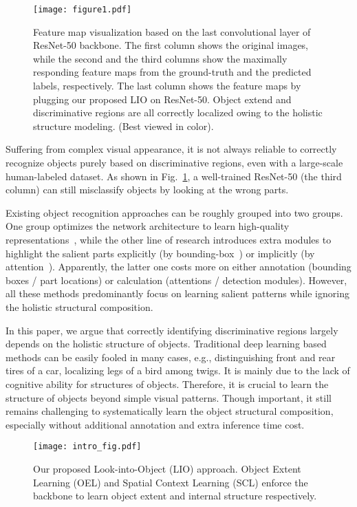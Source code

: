 \documentclass[10pt,twocolumn,letterpaper]{article}
\begin{document}
\begin{figure}[!t]
    \centering
    \texttt{[image: figure1.pdf]}
    \caption{Feature map visualization based on the last convolutional layer of ResNet-50 backbone. The first column shows the original images, while the second and the third columns show the maximally responding feature maps from the ground-truth and the predicted labels, respectively. The last column shows the feature maps by plugging our proposed LIO on ResNet-50. Object extend and discriminative regions are all correctly localized owing to the holistic structure modeling. (Best viewed in color).}
    \label{fig:motivation}
\end{figure}

Suffering from complex visual appearance, it is not always reliable to correctly recognize objects purely based on discriminative regions, even with a large-scale human-labeled dataset. As shown in Fig.~\ref{fig:motivation}, a well-trained ResNet-50 (the third column) can still misclassify objects by looking at the wrong parts.

Existing object recognition approaches can be roughly grouped into two groups. One group optimizes the network architecture to learn high-quality representations~\cite{shih2017deep,BCNN,hu2018squeeze,cui2017kernel}, while the other line of research introduces extra modules to highlight the salient parts explicitly (by bounding-box~\cite{branson2014bird,huang2016part,CoSeq}) or implicitly (by attention~\cite{RACNN,wang2017residual}). Apparently, the latter one costs more on either annotation (\eg bounding boxes / part locations) or calculation (attentions / detection modules). However, all these methods predominantly focus on learning salient patterns while ignoring the holistic structural composition.


In this paper, we argue that correctly identifying discriminative regions largely depends on the holistic structure of objects. Traditional deep learning based methods can be easily fooled in many cases, e.g., distinguishing front and rear tires of a car, localizing legs of a bird among twigs. It is mainly due to the lack of cognitive ability for structures of objects. Therefore, it is crucial to learn the structure of objects beyond simple visual patterns. Though important, it still remains challenging to systematically learn the object structural composition, especially without additional annotation and extra inference time cost.


\begin{figure}[!t]
    \centering
    \texttt{[image: intro\_fig.pdf]}
    \caption{Our proposed Look-into-Object (LIO) approach. Object Extent Learning (OEL) and Spatial Context Learning (SCL) enforce the backbone to learn object extent and internal structure respectively.}
    \label{fig:intro}
\end{figure}
\end{document}
